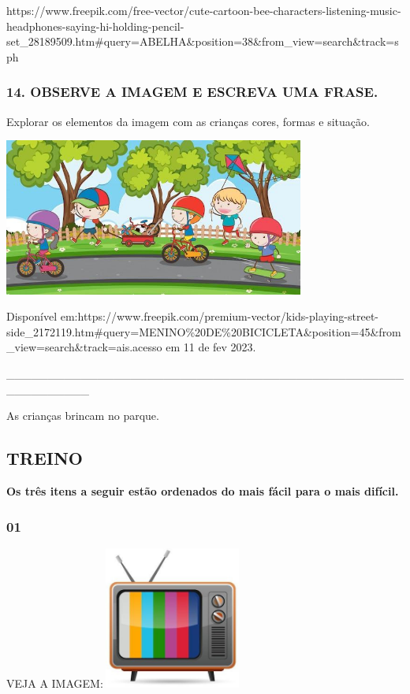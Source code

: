 https://www.freepik.com/free-vector/cute-cartoon-bee-characters-listening-music-headphones-saying-hi-holding-pencil-set\_28189509.htm\#query=ABELHA\&position=38\&from\_view=search\&track=sph

\subsubsection{14. OBSERVE A IMAGEM E ESCREVA UMA
FRASE.}\label{observe-a-imagem-e-escreva-uma-frase.}

Explorar os elementos da imagem com as crianças cores, formas e
situação.

\includegraphics[width=3.88542in,height=2.03581in]{media/image122.jpg}

Disponível
em:https://www.freepik.com/premium-vector/kids-playing-street-side\_2172119.htm\#query=MENINO\%20DE\%20BICICLETA\&position=45\&from\_view=search\&track=ais.acesso
em 11 de fev 2023.

\_\_\_\_\_\_\_\_\_\_\_\_\_\_\_\_\_\_\_\_\_\_\_\_\_\_\_\_\_\_\_\_\_\_\_\_\_\_\_\_\_\_\_\_\_\_\_\_\_\_\_\_\_\_\_\_\_\_

As crianças brincam no parque.

\subsection{TREINO}\label{treino-1}

\textbf{Os três itens a seguir estão ordenados do mais fácil para o mais
difícil. }

\subsubsection{01 }\label{section-4}

VEJA A
IMAGEM:\includegraphics[width=1.82292in,height=1.84306in]{media/image123.jpg}

